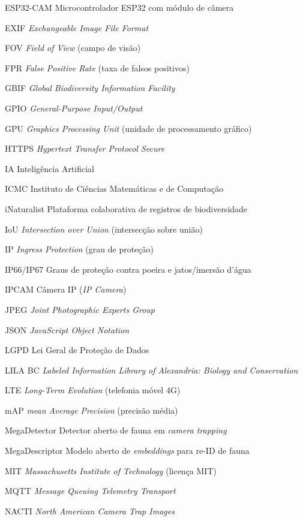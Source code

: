 \begin{siglas}
  \item[ESP32-CAM] Microcontrolador ESP32 com módulo de câmera
  \item[EXIF] \textit{Exchangeable Image File Format}
  \item[FOV] \textit{Field of View} (campo de visão)
  \item[FPR] \textit{False Positive Rate} (taxa de falsos positivos)
  \item[GBIF] \textit{Global Biodiversity Information Facility}
  \item[GPIO] \textit{General-Purpose Input/Output}
  \item[GPU] \textit{Graphics Processing Unit} (unidade de processamento gráfico)
  \item[HTTPS] \textit{Hypertext Transfer Protocol Secure}
  \item[IA] Inteligência Artificial
  \item[ICMC] Instituto de Ciências Matemáticas e de Computação
  \item[iNaturalist] Plataforma colaborativa de registros de biodiversidade
  \item[IoU] \textit{Intersection over Union} (intersecção sobre união)
  \item[IP] \textit{Ingress Protection} (grau de proteção)
  \item[IP66/IP67] Graus de proteção contra poeira e jatos/imersão d'água
  \item[IPCAM] Câmera IP (\textit{IP Camera})
  \item[JPEG] \textit{Joint Photographic Experts Group}
  \item[JSON] \textit{JavaScript Object Notation}
  \item[LGPD] Lei Geral de Proteção de Dados
  \item[LILA BC] \textit{Labeled Information Library of Alexandria: Biology and Conservation}
  \item[LTE] \textit{Long-Term Evolution} (telefonia móvel 4G)
  \item[mAP] \textit{mean Average Precision} (precisão média)
  \item[MegaDetector] Detector aberto de fauna em \textit{camera trapping}
  \item[MegaDescriptor] Modelo aberto de \textit{embeddings} para re-ID de fauna
  \item[MIT] \textit{Massachusetts Institute of Technology} (licença MIT)
  \item[MQTT] \textit{Message Queuing Telemetry Transport}
  \item[NACTI] \textit{North American Camera Trap Images}

\end{siglas}
